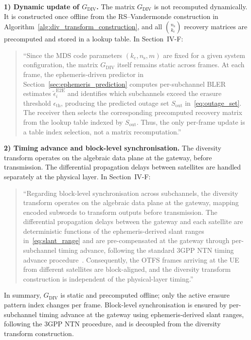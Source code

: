 \textbf{1) Dynamic update of $G_{\mathrm{DIV}}$.}
The matrix $G_{\mathrm{DIV}}$ is not recomputed dynamically. It is constructed once offline from the RS--Vandermonde construction in Algorithm~\ref{alg:div_transform_construction}, and all $\binom{n_{\mathrm{s}}}{k_{\mathrm{c}}}$ recovery matrices are precomputed and stored in a lookup table. In Section~IV-F:

\begin{quote}
``{\color{blue}Since the MDS code parameters $(k_{\mathrm{c}}, n_{\mathrm{s}}, m)$
are fixed for a given system configuration, the matrix
$G_{\mathrm{DIV}}$ itself remains static across frames.
At each frame, the ephemeris-driven predictor in
Section~\ref{sec:ephemeris_prediction} computes per-subchannel
BLER estimates $\tilde{\epsilon}_{i}^{\mathrm{E2E}}$ and
identifies which subchannels exceed the erasure threshold
$\epsilon_{\mathrm{th}}$, producing the predicted outage set
$S_{\mathrm{out}}$ in~\eqref{eq:outage_set}. The receiver then
selects the corresponding precomputed recovery matrix from the
lookup table indexed by $S_{\mathrm{out}}$. Thus, the only
per-frame update is a table index selection, not a matrix
recomputation.}''
\end{quote}

\textbf{2) Timing advance and block-level synchronisation.}
The diversity transform operates on the algebraic data plane at the gateway, before transmission. The differential propagation delays between satellites are handled separately at the physical layer. In Section~IV-F:

\begin{quote}
``{\color{blue}Regarding block-level synchronisation across subchannels, the
diversity transform operates on the algebraic data plane at the
gateway, mapping encoded subwords to transform outputs before
transmission. The differential propagation delays between the
gateway and each satellite are deterministic functions of the
ephemeris-derived slant ranges in~\eqref{eq:slant_range} and are
pre-compensated at the gateway through per-subchannel timing
advance, following the standard 3GPP NTN timing advance
procedure~\cite{3GPP38821}. Consequently, the OTFS frames
arriving at the UE from different satellites are block-aligned,
and the diversity transform construction is independent of the
physical-layer timing.}''
\end{quote}

In summary, $G_{\mathrm{DIV}}$ is static and precomputed offline; only the active erasure pattern index changes per frame. Block-level synchronisation is ensured by per-subchannel timing advance at the gateway using ephemeris-derived slant ranges, following the 3GPP NTN procedure, and is decoupled from the diversity transform construction.

